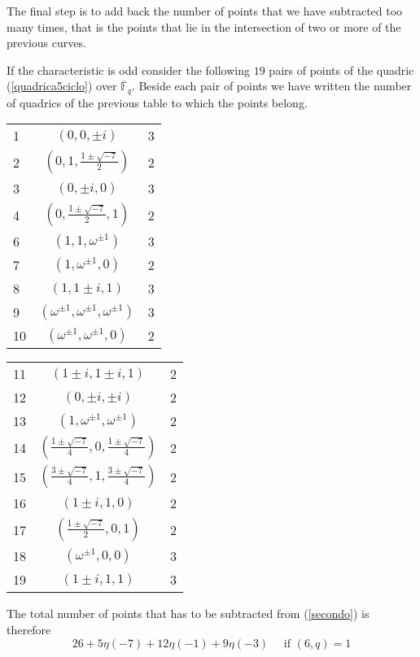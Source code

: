 \documentclass[10pt,a4paper,twoside]{article}
\def\oFq{\overline{\mathbb{F}}_q}
\begin{document}
The final step is to add back the number of points that we have
subtracted too many times,
that is the points that lie in the intersection of two or more of the previous curves.

If the characteristic is odd consider the following $19$ pairs of points of the quadric
(\ref{quadrica5ciclo}) over $\oFq$. Beside each pair of points
we have written the number of quadrics of the previous table to which the points belong.

\begin{center}
\begin{tabular}{|l|c|r|}
\hline
1&$(0,0,\pm i)$   &  3 \\
2&$\left(0,1,\frac{1\pm\sqrt {-7}}{2}\right)$   & 2 \\
3&$(0,\pm i,0)$   &  3 \\
4&$\left(0,\frac{1\pm\sqrt {-7}}{2},1\right)$   &  2  \\
6&$(1,1,\omega^{\pm1})$   &  3 \\
7&$(1,\omega^{\pm1},0)$   &  2  \\
8&$(1,1\pm i,1)$   &  3\\
9&$(\omega^{\pm1},\omega^{\pm1},\omega^{\pm1})$   & 3 \\
10&$(\omega^{\pm1},\omega^{\pm1},0)$   & 2  \\
\hline
\end{tabular}\hspace{2cm}
\begin{tabular}{|l|c|r|}
\hline
 11&$(1\pm i,1\pm i,1)$   &  2\\
 12&$(0,\pm i,\pm i)$   &  2\\
 13&$(1,\omega^{\pm1},\omega^{\pm1})$   &  2 \\
 14&$\left(\frac{1\pm\sqrt {-7}}{4},0,\frac{1\pm\sqrt {-7}}{4}\right)$   & 2 \\
 15&$\left(\frac{3\pm\sqrt {-7}}{4},1,\frac{3\pm\sqrt {-7}}{4}\right)$   &  2\\
 16&$(1\pm i,1,0)$   &  2 \\
 17&$\left(\frac{1\pm\sqrt{-7}}{2},0,1\right)$   & 2 \\
 18&$(\omega^{\pm1},0,0)$ & 3\\
 19&$(1\pm i,1,1)$ & 3\\
\hline
\end{tabular}
\end{center}
The total number of points that has to be subtracted from (\ref{secondo}) is therefore
\begin{equation}\label{terzo}
26+5\eta(-7)+12\eta(-1)+9\eta(-3) \quad \textrm{ if } (6,q)=1
\end{equation}
\end{document}
